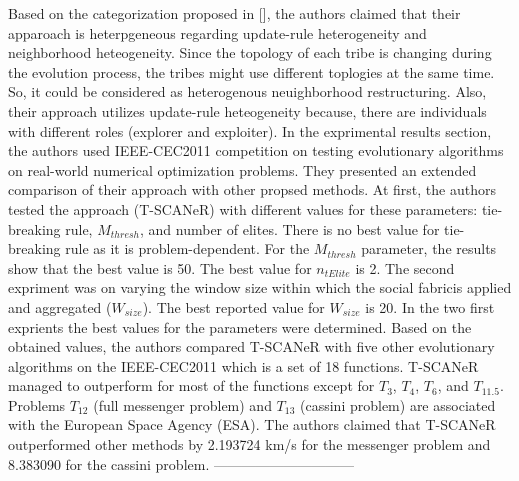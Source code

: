 Based on the categorization proposed in [], the authors claimed that their apparoach is heterpgeneous regarding update-rule heterogeneity and neighborhood heteogeneity. Since the topology of each tribe is changing during the evolution process, the tribes might use different toplogies at the same time. So, it could be considered as heterogenous neuighborhood restructuring. Also, their approach utilizes update-rule heteogeneity because, there are individuals with different roles (explorer and exploiter). \newline
In the exprimental results section, the authors used IEEE-CEC2011 competition on testing evolutionary algorithms on real-world numerical optimization problems. They presented an extended comparison of their approach with other propsed methods. At first, the authors tested the approach (T-SCANeR) with different values for these parameters: tie-breaking rule, $M_{thresh}$, and number of elites. There is no best value for tie-breaking rule as it is problem-dependent. For the $M_{thresh}$ parameter, the results show that the best value is 50. The best value for $n_{tElite}$ is 2. The second expriment was on varying the  window  size  within  which  the  social  fabricis  applied  and  aggregated ($W_{size}$). The best reported value for $W_{size}$ is 20. \newline
In the two first exprients the best values for the parameters were determined. Based on the obtained values, the authors compared T-SCANeR with five other evolutionary algorithms on the IEEE-CEC2011 which is a set of 18 functions. T-SCANeR managed to outperform for most of the functions except for $T_{3}$, $T_{4}$, $T_{6}$, and $T_{11.5}$. Problems $T_{12}$ (full messenger problem) and $T_{13}$ (cassini problem) are associated with the European Space Agency (ESA). The authors claimed that T-SCANeR outperformed other methods by 2.193724 km/s for the messenger problem and 8.383090 for the cassini problem.
\newline------------------------------\newline

